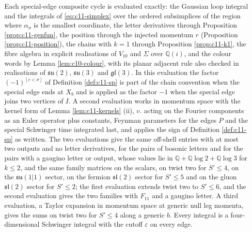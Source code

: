 \begin{remark}
\label{rem:c11-method}
Each special-edge composite cycle is evaluated exactly: the Gaussian loop integral and the integrals of \eqref{eq:c11-simplex} over the ordered subsimplices of the region where $\alpha_\sigma$ is the smallest coordinate, the letter derivatives through Proposition \ref{prop:c11-genfun}, the position through the injected momentum $r$ (Proposition \ref{prop:c11-position}), the chains with $k=1$ through Proposition \ref{prop:c11-k1}, the fibre algebra in explicit realisations of $V_{10}$ and $\Sigma$ over $\mathbb Q(i)$, and the colour words by Lemma \ref{lem:c10-colour}, with its planar adjacent rule also checked in realisations of $\mathfrak{su}(2)$, $\mathfrak{su}(3)$ and $\mathfrak{gl}(3)$. In this evaluation the factor $(-1)^{[c<\sigma]}$ of Definition \ref{def:c11-sp} is part of the chain convention when the special edge ends at $X_b$ and is applied as the factor $-1$ when the special edge joins two vertices of $I$. A second evaluation works in momentum space with the kernel form of Lemma \ref{lem:c11-kernels} (ii), $v.$ acting on the Fourier components as an Euler operator plus constants, Feynman parameters for the edges $P$ and the special Schwinger time integrated last, and applies the sign of Definition \ref{def:c11-sp} as written. The two evaluations give the same off-shell entries with at most two outputs and no letter derivatives, for the pairs of bosonic letters and for the pairs with a gaugino letter or output, whose values lie in $\mathbb Q+\mathbb Q\log2+\mathbb Q\log3$ for $k\le2$, and the same family matrices on the scalars, on twist two for $S'\le4$, on the $\mathfrak{su}(1|1)$ sector, on the fermion $\mathfrak{sl}(2)$ sector for $S'\le5$ and on the gluon $\mathfrak{sl}(2)$ sector for $S'\le2$; the first evaluation extends twist two to $S'\le6$, and the second evaluation gives the two families with $F_{11}$ and a gaugino letter. A third evaluation, a Taylor expansion in momentum space at generic null leg momenta, gives the sums on twist two for $S'\le4$ along a generic $b$. Every integral is a four-dimensional Schwinger integral with the cutoff $\varepsilon$ on every edge.
\end{remark}

